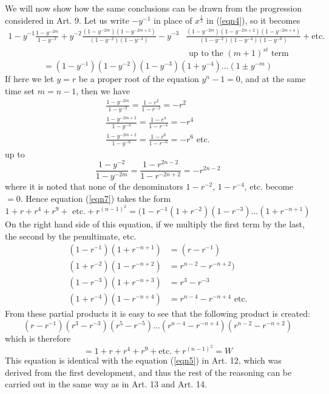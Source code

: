 \documentclass{book}
\theoremstyle{plain}
\theoremstyle{remark}
\begin{document}
We will now show how the same conclusions can be drawn from the progression considered in Art. 9.  Let us write  $-y^{-1}$ in place of $x^{\frac{1}{2}}$ in (\ref{eqn4}), so it becomes
\begin{align*} 1 - y^{-1} \frac{1-y^{-2m}}{1-y^{-2}} + y^{-2}\frac{(1-y^{-2m})(1-y^{-2m+2})}{(1-y^{-2})(1-y^{-4})} 
- y^{-3}&\frac{(1-y^{-2m})(1-y^{-2m+2})(1-y^{-2m+4})}{(1-y^{-2})(1-y^{-4})(1-y^{-6})} + \textrm{etc.} \\ &\textrm{ up to the }(m+1)^{st}\textrm{ term} \end{align*}
\begin{equation} = (1-y^{-1})(1-y^{-2})(1-y^{-3})(1+y^{-4})\dots (1\pm y^{-m}) \label{eqn7} \end{equation}
If here we let $y=r$ be a proper root of the equation $y^n-1=0$, and at the same time set $m=n-1$, then we have 
\begin{align*} 
\frac{1-y^{-2m}}{1-y^{-2}} = \frac{1-r^2}{1-r^{-2}} = -r^2 \\
\frac{1-y^{-2m+2}}{1-y^{-4}} = \frac{1-r^4}{1-r^{-4}} = -r^4 \\
\frac{1-y^{-2m+2}}{1-y^{-6}} = \frac{1-r^6}{1-r^{-6}} = -r^6 \textrm{ etc.}
\end{align*}
up to
\[ \frac{1-y^{-2}}{1-y^{-2m}} = \frac{1-r^{2n-2}}{1-r^{-2n+2}} = -r^{2n-2} \]
where it is noted that none of the denominators $1-r^{-2}$, $1-r^{-4}$, etc. become $=0$.  Hence equation (\ref{eqn7}) takes the form
\[ 1 + r + r^4 + r^9 + \textrm{ etc.} + r^{(n-1)^2} = (1-r^{-1}(1+r^{-2})(1-r^{-3})\dots(1+r^{-n+1}) \]
On the right hand side of this equation, if we multiply the first term by the last, the second by the penultimate, etc.
\begin{align*} 
(1-r^{-1})(1+r^{-n+1}) &= (r-r^{-1}) \\
(1+r^{-2})(1-r^{-n+2}) &= r^{n-2}-r^{-n+2}) \\
(1-r^{-3})(1+r^{-n+3}) &= r^3 - r^{-3} \\
(1+r^{-4})(1-r^{-n+4}) &= r^{n-4} - r^{-n+4} \textrm{ etc.} 
\end{align*}
From these partial products it is easy to see that the following product is created:
\[ (r-r^{-1})(r^3-r^{-3})(r^5-r^{-5})\dots (r^{n-4}-r^{-n+4})(r^{n-2}-r^{-n+2}) \]
which is therefore 
\[ = 1 + r + r^4 + r^9 + \textrm{etc.} + r^{(n-1)^2} = W \]
This equation is identical with the equation (\ref{eqn5}) in Art. 12, which was derived from the first development, and thus the rest of the reasoning can be carried out in the same way as in Art. 13 and Art. 14. 
\end{document}
